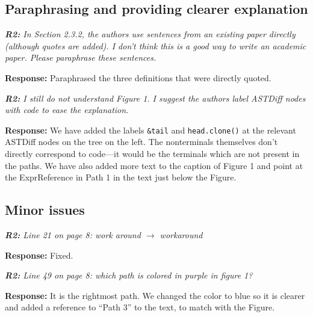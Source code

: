 \documentclass{article}
\begin{document}
\subsection{Paraphrasing and providing clearer explanation}

\textit{\textbf{R2:} In Section 2.3.2, the authors use sentences from an existing paper directly (although quotes are added). I don't think this is a good way to write an academic paper. Please paraphrase these sentences.}

\vspace*{1em} \noindent \textbf{Response:} Paraphrased the three definitions that were directly quoted.

\vspace*{1em} \noindent \textit{\textbf{R2: } I still do not understand Figure 1. I suggest the authors label ASTDiff nodes with code to ease the explanation.}

\vspace*{1em} \noindent \textbf{Response:} We have added the labels {\tt \&tail} and {\tt head.clone()} at the relevant ASTDiff nodes on the tree on the left. The nonterminals themselves don't directly correspond to code---it would be the terminals which are not present in the paths. We have also added more text to the caption of Figure 1 and point at the ExprReference in Path 1 in the text just below the Figure.

\subsection{Minor issues}

\textit{\textbf{R2:} Line 21 on page 8: work around $\rightarrow$ workaround}

\vspace*{1em} \noindent \textbf{Response:} Fixed.

\vspace*{1em} \noindent \textit{\textbf{R2:} Line 49 on page 8: which path is colored in purple in figure 1?}

\vspace*{1em} \noindent \textbf{Response:} It is the rightmost path. We changed the color to blue so it is clearer and added a reference to ``Path 3'' to the text, to match with the Figure.

\small


\end{document}
